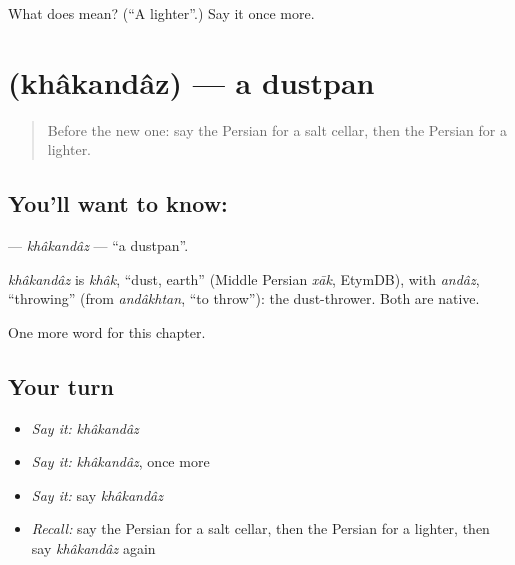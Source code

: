 \begin{tcolorbox}[breakable,colback=teal!4,colframe=teal!35!black,title={Before you move on}]
What does  mean? (\textquotedblleft{}A lighter\textquotedblright{}.) Say it once more.
\end{tcolorbox}
\section[\texorpdfstring{\fa{خاک} \fa{انداز} (khâkandâz)}{خاک انداز (khâkandâz)}]{  (khâkandâz) — a dustpan}

\label{lesson:FA-C175-khakandaz}



\begin{quote}
Before the new one: say the Persian for a salt cellar, then the Persian for a lighter.
\end{quote}

\subsection*{You'll want to know:  }
\textbf{ } — \emph{khâkandâz} — \textquotedblleft{}a dustpan\textquotedblright{}.

\begin{cousinweb}
\emph{khâkandâz} is \emph{khâk}, \textquotedblleft{}dust, earth\textquotedblright{} (Middle Persian \emph{xāk}, EtymDB), with \emph{andâz}, \textquotedblleft{}throwing\textquotedblright{} (from \emph{andâkhtan}, \textquotedblleft{}to throw\textquotedblright{}): the dust-thrower. Both are native.
\end{cousinweb}

\begin{grammarlens}[title={What you've built}]
One more word for this chapter.
\end{grammarlens}

\subsection*{Your turn}
\begin{itemize}
\raggedright
  \item \emph{Say it:} \emph{khâkandâz}
  \item \emph{Say it:} \emph{khâkandâz}, once more
  \item \emph{Say it:} say \emph{khâkandâz}
  \item \emph{Recall:} say the Persian for a salt cellar, then the Persian for a lighter, then say \emph{khâkandâz} again
\end{itemize}

